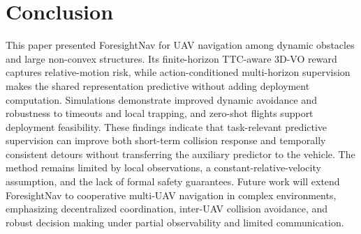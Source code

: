 \documentclass[letterpaper, 10 pt, conference]{ieeeconf}
\begin{document}
\section{Conclusion}\label{sec:conclusion}
	This paper presented ForesightNav for UAV navigation among dynamic obstacles and large non-convex structures. Its finite-horizon TTC-aware 3D-VO reward captures relative-motion risk, while action-conditioned multi-horizon supervision makes the shared representation predictive without adding deployment computation. Simulations demonstrate improved dynamic avoidance and robustness to timeouts and local trapping, and zero-shot flights support deployment feasibility. These findings indicate that task-relevant predictive supervision can improve both short-term collision response and temporally consistent detours without transferring the auxiliary predictor to the vehicle. The method remains limited by local observations, a constant-relative-velocity assumption, and the lack of formal safety guarantees. Future work will extend ForesightNav to cooperative multi-UAV navigation in complex environments, emphasizing decentralized coordination, inter-UAV collision avoidance, and robust decision making under partial observability and limited communication.



\end{document}

